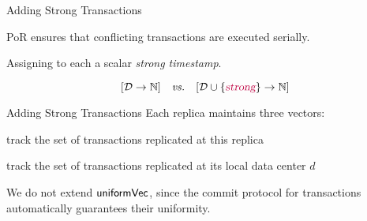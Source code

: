 
\begin{frame}{Adding Strong Transactions}
  \begin{center}
    PoR ensures that conflicting transactions are executed serially.

    \vspace{0.50cm}
    Assigning to each  a scalar \emph{strong timestamp}.
  \end{center}

  \vspace{0.30cm}
  \[
    [\mathcal{D} \to \mathbb{N}] \quad\text{\emph{vs.}}\quad [\mathcal{D} \cup \{\textcolor{purple}{\textsl{strong}}\} \to \mathbb{N}]
  \]

\end{frame}

\begin{frame}{Adding Strong Transactions}
  Each replica maintains three vectors: \\[5pt]

  \begin{description} %
    \setlength{\itemsep}{10pt}
    \item[$\knownVC\text{[\strongcolor{\strongentry}]}$:] track the set of  transactions replicated at this replica
    \item[$\stableVC\text{[\strongcolor{\strongentry}]}$:] track the set of  transactions replicated at its local data center $d$
    \item[$\uniformVC$:] We do not extend $\uniformVC$, since the commit protocol for
       transactions automatically guarantees their uniformity.
  \end{description}
\end{frame}


